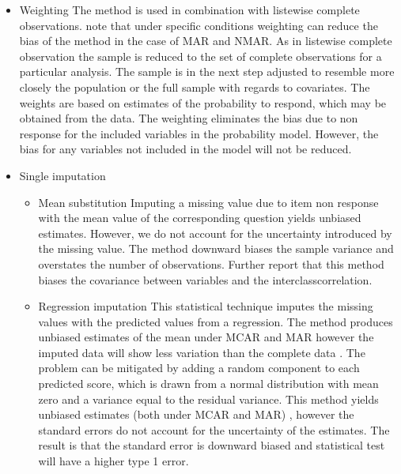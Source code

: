 \begin{itemize}
 \item Weighting
The method is used in combination with listewise complete observations. \cite{schafer2002missing} note that under specific conditions weighting can reduce the bias of the method in the case of MAR and NMAR. As in listewise complete observation the sample is reduced to the set of complete observations for a particular analysis. The sample is in the next step adjusted to resemble more closely the population or the full sample with regards to covariates. The weights are based on estimates of the probability to respond, which may be obtained from the data. The weighting eliminates the bias due to non response for the included variables in the probability model. However, the bias for any variables not included in the model will not be reduced.
\end{itemize}
 \begin{itemize} 
\item Single imputation
\begin{itemize}
\item Mean substitution
Imputing a missing value due to item non response with the mean value of the corresponding question yields unbiased estimates. However, we do not account for the uncertainty introduced by the missing value. The method downward biases the sample variance and  overstates the number of observations. Further \cite{schafer2002missing} report that this method biases the covariance between variables and the interclasscorrelation. 
\item  Regression imputation
This statistical technique imputes the missing values with the predicted values from a regression. The method produces unbiased estimates of the mean under MCAR and MAR however the imputed data will show less variation than the complete data \cite{baraldi2010introduction}. The problem can be mitigated by adding a random component to each predicted score, which is drawn from a normal distribution with mean zero and a variance equal to the residual variance. This method yields unbiased estimates (both under MCAR and MAR) , however the standard errors do not account for the uncertainty of the estimates. The result is that the standard error is downward biased and statistical test will have a higher type 1 error. 
 \end{itemize}  

\end{itemize}  
